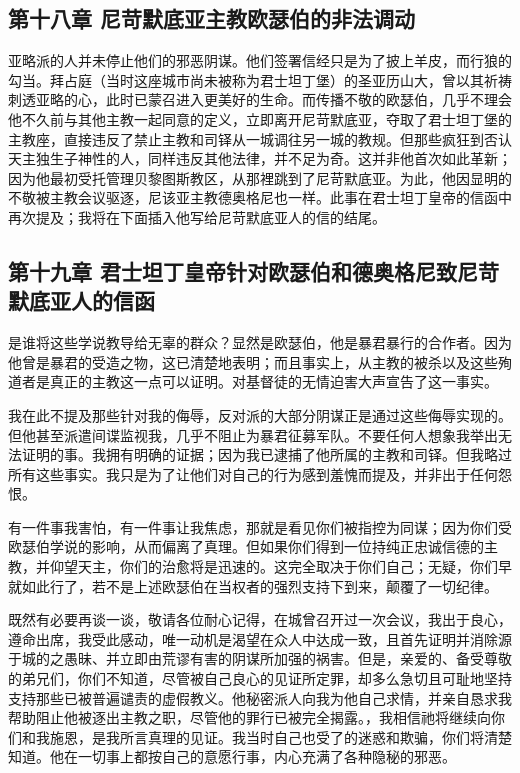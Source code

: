 \subsection{第十八章  尼苛默底亚主教欧瑟伯的非法调动}

亚略派的人并未停止他们的邪恶阴谋。他们签署信经只是为了披上羊皮，而行狼的勾当。拜占庭（当时这座城市尚未被称为君士坦丁堡）的圣亚历山大，曾以其祈祷刺透亚略的心，此时已蒙召进入更美好的生命。而传播不敬的欧瑟伯，几乎不理会他不久前与其他主教一起同意的定义，立即离开尼苛默底亚，夺取了君士坦丁堡的主教座，直接违反了禁止主教和司铎从一城调往另一城的教规。但那些疯狂到否认天主独生子神性的人，同样违反其他法律，并不足为奇。这并非他首次如此革新；因为他最初受托管理贝黎图斯教区，从那裡跳到了尼苛默底亚。为此，他因显明的不敬被主教会议驱逐，尼该亚主教德奥格尼也一样。此事在君士坦丁皇帝的信函中再次提及；我将在下面插入他写给尼苛默底亚人的信的结尾。\par


\subsection{第十九章  君士坦丁皇帝针对欧瑟伯和德奥格尼致尼苛默底亚人的信函}

是谁将这些学说教导给无辜的群众？显然是欧瑟伯，他是暴君暴行的合作者。因为他曾是暴君的受造之物，这已清楚地表明；而且事实上，从主教的被杀以及这些殉道者是真正的主教这一点可以证明。对基督徒的无情迫害大声宣告了这一事实。\par

我在此不提及那些针对我的侮辱，反对派的大部分阴谋正是通过这些侮辱实现的。但他甚至派遣间谍监视我，几乎不阻止为暴君征募军队。不要任何人想象我举出无法证明的事。我拥有明确的证据；因为我已逮捕了他所属的主教和司铎。但我略过所有这些事实。我只是为了让他们对自己的行为感到羞愧而提及，并非出于任何怨恨。\par

有一件事我害怕，有一件事让我焦虑，那就是看见你们被指控为同谋；因为你们受欧瑟伯学说的影响，从而偏离了真理。但如果你们得到一位持纯正忠诚信德的主教，并仰望天主，你们的治愈将是迅速的。这完全取决于你们自己；无疑，你们早就如此行了，若不是上述欧瑟伯在当权者的强烈支持下到来，颠覆了一切纪律。\par

既然有必要再谈一谈，敬请各位耐心记得，在城曾召开过一次会议，我出于良心，遵命出席，我受此感动，唯一动机是渴望在众人中达成一致，且首先证明并消除源于城的之愚昧、并立即由荒谬有害的阴谋所加强的祸害。但是，亲爱的、备受尊敬的弟兄们，你们不知道，尽管被自己良心的见证所定罪，却多么急切且可耻地坚持支持那些已被普遍谴责的虚假教义。他秘密派人向我为他自己求情，并亲自恳求我帮助阻止他被逐出主教之职，尽管他的罪行已被完全揭露。，我相信祂将继续向你们和我施恩，是我所言真理的见证。我当时自己也受了的迷惑和欺骗，你们将清楚知道。他在一切事上都按自己的意愿行事，内心充满了各种隐秘的邪恶。\par

